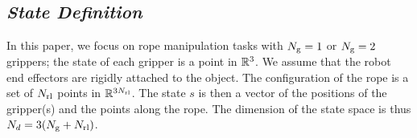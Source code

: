 \subsection{\textit{State Definition}}

In this paper, we focus on rope manipulation tasks with $N_\text{g}=1$ or $N_\text{g}=2$ grippers; the state of each gripper is a point in $\mathbb{R}^3$. We assume that the robot end effectors are rigidly attached to the object. The configuration of the rope is a set of $N_\text{rl}$ points in $\mathbb{R}^{3N_\text{rl}}$. The state $s$ is then a vector of the positions of the gripper(s) and the points along the rope. The dimension of the state space is thus $N_d = 3 (N_\text{g} + N_\text{rl} )$.
